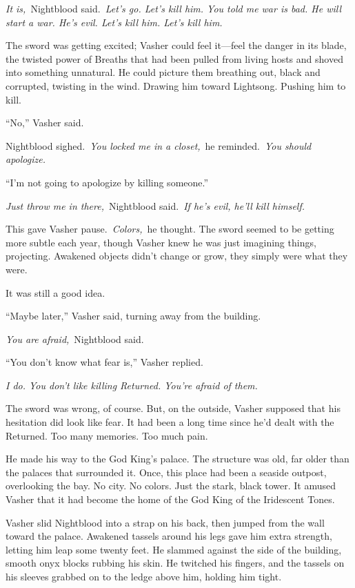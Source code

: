 \textit{It is,}~Nightblood said.~\textit{Let’s go. Let’s kill him. You told me war is bad. He will start a war. He’s evil. Let’s kill him. Let’s kill him.}

The sword was getting excited; Vasher could feel it—feel the danger in its blade, the twisted power of Breaths that had been pulled from living hosts and shoved into something unnatural. He could picture them breathing out, black and corrupted, twisting in the wind. Drawing him toward Lightsong. Pushing him to kill.

“No,” Vasher said.

Nightblood sighed.~\textit{You locked me in a closet,}~he reminded.~\textit{You should apologize.}

“I’m not going to apologize by killing someone.”

\textit{Just throw me in there,}~Nightblood said.~\textit{If he’s evil, he’ll kill himself.}

This gave Vasher pause.~\textit{Colors,}~he thought. The sword seemed to be getting more subtle each year, though Vasher knew he was just imagining things, projecting. Awakened objects didn’t change or grow, they simply were what they were.

It was still a good idea.

“Maybe later,” Vasher said, turning away from the building.

\textit{You are afraid,}~Nightblood said.

“You don’t know what fear is,” Vasher replied.

\textit{I do. You don’t like killing Returned. You’re afraid of them.}

The sword was wrong, of course. But, on the outside, Vasher supposed that his hesitation did look like fear. It had been a long time since he’d dealt with the Returned. Too many memories. Too much pain.

He made his way to the God King’s palace. The structure was old, far older than the palaces that surrounded it. Once, this place had been a seaside outpost, overlooking the bay. No city. No colors. Just the stark, black tower. It amused Vasher that it had become the home of the God King of the Iridescent Tones.

Vasher slid Nightblood into a strap on his back, then jumped from the wall toward the palace. Awakened tassels around his legs gave him extra strength, letting him leap some twenty feet. He slammed against the side of the building, smooth onyx blocks rubbing his skin. He twitched his fingers, and the tassels on his sleeves grabbed on to the ledge above him, holding him tight.


